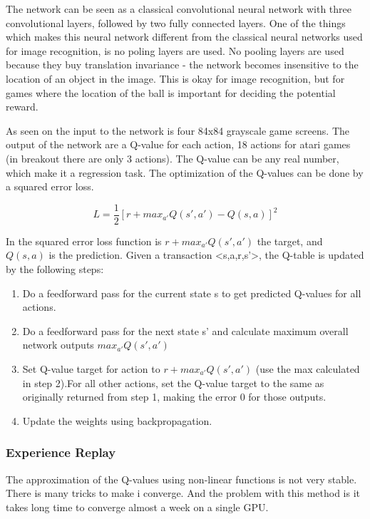 The network can be seen as a classical convolutional neural network with three convolutional layers, followed by two fully connected layers. One of the things which makes this neural network different from the classical neural networks used for image recognition, is no poling layers are used. No pooling layers are used because they buy translation invariance -  the network becomes insensitive to the location of an object in the image. This is okay for image recognition, but for games where the location of the ball is important for deciding the potential reward.  

As seen on  the input to the network is four 84x84 grayscale game screens. The output of the network are a Q-value for each action, 18 actions for atari games (in breakout there are only 3 actions). The Q-value can be any real number, which make it a regression task. The optimization of the Q-values can be done by a squared error loss. 

\begin{equation}
L=\frac{1}{2}[r+max_{a'}Q(s',a')-Q(s,a)]^2
\end{equation}  

In the squared error loss function is $r+max_{a'}Q(s',a')$ the target, and $Q(s,a)$ is the prediction. Given a transaction <s,a,r,s'>, the Q-table is updated by the following steps:
\begin{enumerate}
	\item Do a feedforward pass for the current state s to get predicted Q-values for all actions.
	\item Do a feedforward pass for the next state s’ and calculate maximum overall network outputs $max_{a'}Q(s',a')$
	\item Set Q-value target for action to $r+max_{a'}Q(s',a')$ (use the max calculated in step 2).For all other actions, set the Q-value target to the same as originally returned from step 1, making the error 0 for those outputs. 
	\item Update the weights using backpropagation.
\end{enumerate}

\subsubsection{Experience Replay}
The approximation of the Q-values using non-linear functions is not very stable. There is many tricks to make i converge. And the problem with this method is it takes long time to converge almost a week on a single GPU. 

